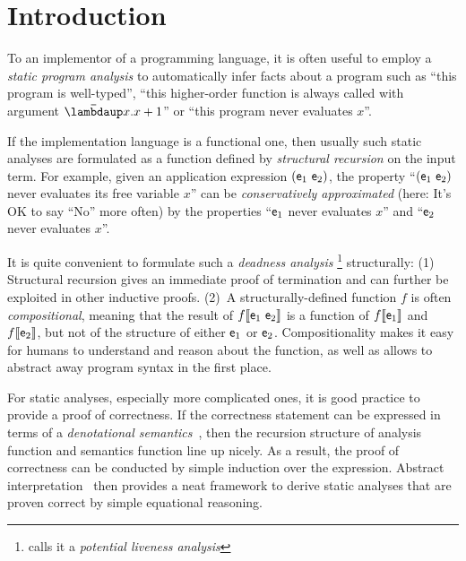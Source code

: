 \section{Introduction}
\label{sec:introduction}

To an implementor of a programming language, it is often useful to employ a
\emph{static program analysis} to automatically infer facts about a program such
as ``this program is well-typed'', ``this higher-order function is always called
with argument $\Lam{x}{x+1}$'' or ``this program never evaluates $x$''.

If the implementation language is a functional one, then usually such static
analyses are formulated as a function defined by \emph{structural recursion} on
the input term.
For example, given an application expression $(\mathsf{e}_1~\mathsf{e}_2)$,
the property ``$(\mathsf{e}_1~\mathsf{e}_2)$ never evaluates its free variable $x$'' can be
\emph{conservatively approximated} (here: It's OK to say ``No'' more often) by
the properties ``$\mathsf{e}_1$ never evaluates $x$'' and ``$\mathsf{e}_2$ never evaluates
$x$''.

It is quite convenient to formulate such a \emph{deadness analysis}%
\footnote{\citet{Cousot:21} calls it a \emph{potential liveness analysis}}
structurally:
(1) Structural recursion gives an immediate proof of termination and can
    further be exploited in other inductive proofs.
(2)~A structurally-defined function $f$ is often \emph{compositional}, meaning that
    the result of $f\llbracket {\mathsf{e}_1~\mathsf{e}_2} \rrbracket$ is a function of $f\llbracket {\mathsf{e}_1} \rrbracket$ and
    $f\llbracket {\mathsf{e}_2} \rrbracket$, but not of the structure of either $\mathsf{e}_1$ or $\mathsf{e}_2$.
    Compositionality makes it easy for humans to understand and reason about the
    function, as well as allows to abstract away program syntax in the first
    place.

For static analyses, especially more complicated ones, it is good practice to
provide a proof of correctness.
If the correctness statement can be expressed in terms of a \emph{denotational
semantics}~\citep{ScottStrachey:71}, then the recursion structure of analysis
function and semantics function line up nicely.
As a result, the proof of correctness can be conducted by simple induction
over the expression. Abstract interpretation~\citep{Cousot:21} then provides
a neat framework to derive static analyses that are proven correct by simple
equational reasoning.

